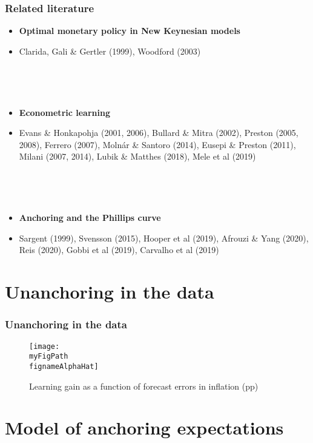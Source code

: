 \documentclass[10pt]{beamer}
\def \myFigPath {../../../figures/}
\def\mySmallerFigScale{0.18}
\def\fignameAlphaHat{alph_opt_constant_only_pi_only_N_100_nfe_5femax_2_loss_382_gridspacing_manual_Wdiffs2_100000_Wmid_1000_Nsimulations_scaleW_0_use_expectations_0_use_meas_error_0_command_GMM_LOMgain_univariate_12_Aug_2020_09_16_29}
\begin{document}
\begin{frame}
	\frametitle{Related literature}

\begin{itemize}
\item \textbf{Optimal monetary policy in New Keynesian models}
\item[] Clarida, Gali \& Gertler (1999), Woodford (2003)

\

\

\item \textbf{Econometric learning}
\item[] Evans \& Honkapohja (2001, 2006), Bullard \& Mitra (2002), Preston (2005, 2008), Ferrero (2007), Moln\'ar \& Santoro (2014), Eusepi \& Preston (2011), Milani (2007, 2014), Lubik \& Matthes (2018), Mele et al (2019)

\

\

\item \textbf{Anchoring and the Phillips curve} 
\item[] Sargent (1999), Svensson (2015), Hooper et al (2019), Afrouzi \& Yang (2020), Reis (2020), Gobbi et al (2019), Carvalho et al (2019)
\end{itemize}



\end{frame}

\section{Unanchoring in the data}

\begin{frame}
	\frametitle{Unanchoring in the data}

\begin{figure}[h!]
\texttt{[image: \\myFigPath \\fignameAlphaHat]}
\caption{Learning gain as a function of forecast errors in inflation (pp)}
\label{epi}
\end{figure}


\end{frame}

\section{Model of anchoring expectations}
\end{document}
